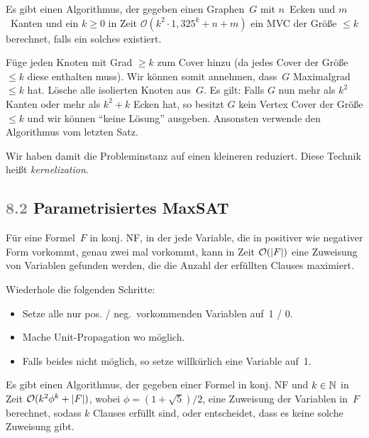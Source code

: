 \documentclass{cheat-sheet}
\newcommand{\size}[1]{\abs{#1}} %
\renewcommand{\O}{\mathcal{O}} %
\newcommand{\Problem}[1]{\textcolor{ProblemColor}{\textbf{#1}}}
\newcommand{\scriptSection}[1]{\textcolor{gray}{#1}\enspace}
\begin{document}
\begin{satz}
  Es gibt einen Algorithmus, der gegeben einen Graphen~$G$ mit $n$~Ecken und $m$~Kanten und ein $k \geq 0$ in Zeit $\O(k^2 \cdot 1,325^{k} + n + m)$ ein MVC der Größe $\leq k$ berechnet, falls ein solches existiert.
\end{satz}

\begin{idee}
  Füge jeden Knoten mit Grad $\geq k$ zum Cover hinzu (da jedes Cover der Größe $\leq k$ diese enthalten muss).
  Wir können somit annehmen, dass~$G$ Maximalgrad $\leq k$ hat.
  Lösche alle isolierten Knoten aus~$G$.
  Es gilt: Falls $G$ nun mehr als $k^2$ Kanten oder mehr als $k^2 + k$ Ecken hat, so besitzt $G$ kein Vertex Cover der Größe $\leq k$ und wir können "`keine Lösung"' ausgeben.
  Ansonsten verwende den Algorithmus vom letzten Satz.
\end{idee}

\begin{bem}
  Wir haben damit die Probleminstanz auf einen kleineren  reduziert.
  Diese Technik heißt \textit{kernelization}.
\end{bem}

\subsection{\scriptSection{8.2} Parametrisiertes \Problem{MaxSAT}}


\begin{lem}
  Für eine Formel~$F$ in konj. NF, in der jede Variable, die in positiver wie negativer Form vorkommt, genau zwei mal vorkommt, kann in Zeit $\O(\size{F})$ eine Zuweisung von Variablen gefunden werden, die die Anzahl der erfüllten Clauses maximiert.
\end{lem}

\begin{alg}
  Wiederhole die folgenden Schritte:
  \begin{itemize}
    \item Setze alle nur pos. / neg.\ vorkommenden Variablen auf~1 / 0.
    \item Mache Unit-Propagation wo möglich.
    \item Falls beides nicht möglich, so setze willkürlich eine Variable auf~1.
  \end{itemize}
\end{alg}

\begin{satz}
  Es gibt einen Algorithmus, der gegeben einer Formel in konj. NF und $k \in \mathbb{N}$ in Zeit $\O(k^2 \phi^k + \size{F})$, wobei $\phi = (1 + \sqrt{5}) / 2$, eine Zuweisung der Variablen in~$F$ berechnet, sodass $k$ Clauses erfüllt sind, oder entscheidet, dass es keine solche Zuweisung gibt.
\end{satz}
\end{document}

